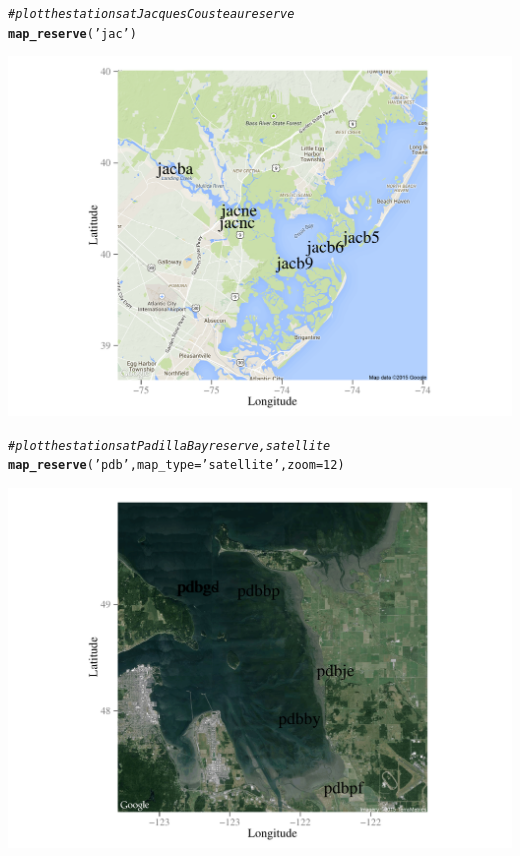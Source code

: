 \documentclass[10pt,letterpaper]{article}\usepackage[]{graphicx}\usepackage[]{color}
\makeatletter
\def\maxwidth{ %
  \ifdim\Gin@nat@width>\linewidth
    \linewidth
  \else
    \Gin@nat@width
  \fi
}
\newcommand{\hlnum}[1]{\textcolor[rgb]{0.686,0.059,0.569}{#1}}%
\newcommand{\hlstr}[1]{\textcolor[rgb]{0.192,0.494,0.8}{#1}}%
\newcommand{\hlcom}[1]{\textcolor[rgb]{0.678,0.584,0.686}{\textit{#1}}}%
\newcommand{\hlstd}[1]{\textcolor[rgb]{0.345,0.345,0.345}{#1}}%
\newcommand{\hlkwc}[1]{\textcolor[rgb]{0.333,0.667,0.333}{#1}}%
\newcommand{\hlkwd}[1]{\textcolor[rgb]{0.737,0.353,0.396}{\textbf{#1}}}%
\newenvironment{kframe}{%
 \def\at@end@of@kframe{}%
 \ifinner\ifhmode%
  \def\at@end@of@kframe{\end{minipage}}%
  \begin{minipage}{\columnwidth}%
 \fi\fi%
 \def\FrameCommand##1{\hskip\@totalleftmargin \hskip-\fboxsep
 \colorbox{shadecolor}{##1}\hskip-\fboxsep
     \hskip-\linewidth \hskip-\@totalleftmargin \hskip\columnwidth}%
 \MakeFramed {\advance\hsize-\width
   \@totalleftmargin\z@ \linewidth\hsize
   \@setminipage}}%
 {\par\unskip\endMakeFramed%
 \at@end@of@kframe}
\newenvironment{knitrout}{}{} %
\makeatother
\begin{document}
\begin{knitrout}
\color{fgcolor}\begin{kframe}
\begin{alltt}
\hlcom{# plot the stations at Jacques Cousteau reserve}
\hlkwd{map_reserve}\hlstd{(}\hlstr{'jac'}\hlstd{)}
\end{alltt}
\end{kframe}

{\centering \includegraphics[width=\maxwidth]{figure/unnamed-chunk-201} 

}


\begin{kframe}\begin{alltt}
\hlcom{# plot the stations at Padilla Bay reserve, satellite}
\hlkwd{map_reserve}\hlstd{(}\hlstr{'pdb'}\hlstd{,} \hlkwc{map_type} \hlstd{=} \hlstr{'satellite'}\hlstd{,} \hlkwc{zoom} \hlstd{=} \hlnum{12}\hlstd{)}
\end{alltt}
\end{kframe}

{\centering \includegraphics[width=\maxwidth]{figure/unnamed-chunk-202} 

}



\end{knitrout}
\end{document}
